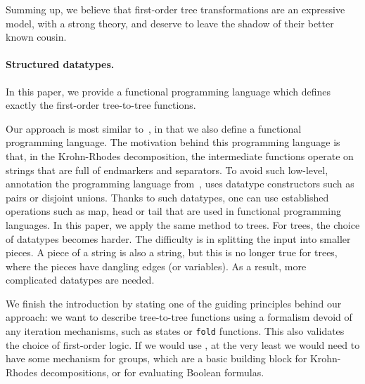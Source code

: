 Summing up, we believe that first-order  tree transformations are an expressive model, with a strong theory, and deserve to leave the shadow of their better known \mso cousin.


\paragraph*{Structured datatypes.} In this paper, we provide a functional programming language which defines exactly the first-order tree-to-tree functions. 

Our approach is most similar to~\cite{bojanczykRegularFirstOrderList2018},  in that we also define a functional programming language. The motivation behind this programming language is that, in the  Krohn-Rhodes decomposition, the   intermediate functions  operate on strings that are full of endmarkers and separators.   To avoid such low-level, annotation the programming language from~\cite{bojanczykRegularFirstOrderList2018}, uses  datatype constructors such as pairs or disjoint unions.  Thanks to such datatypes, one can use established operations such as map, head or tail that are used in functional programming languages. 
In this paper, we apply the same method to trees.
For trees,  the choice of datatypes  becomes harder. The difficulty is in splitting the input into smaller pieces. A piece of a string is also a string, but this is no longer true for trees, where the pieces have dangling edges (or variables). As a result, more complicated  datatypes are needed.

We finish the introduction by stating 
one of the guiding principles behind our approach:  we want to describe tree-to-tree functions using a formalism devoid of any iteration mechanisms, such as states or {\tt fold} functions. This also validates the choice of first-order logic. If we would use \mso, at the very least we would need to have some mechanism for groups, which are a basic building block for Krohn-Rhodes decompositions, or for evaluating Boolean formulas. 




